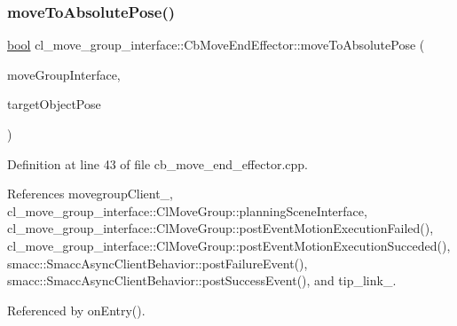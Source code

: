 \subsubsection{\texorpdfstring{move\+To\+Absolute\+Pose()}{moveToAbsolutePose()}}
{\footnotesize\ttfamily \hyperlink{classbool}{bool} cl\+\_\+move\+\_\+group\+\_\+interface\+::\+Cb\+Move\+End\+Effector\+::move\+To\+Absolute\+Pose (\begin{DoxyParamCaption}\item[{moveit\+::planning\+\_\+interface\+::\+Move\+Group\+Interface \&}]{move\+Group\+Interface,  }\item[{geometry\+\_\+msgs\+::\+Pose\+Stamped \&}]{target\+Object\+Pose }\end{DoxyParamCaption})\hspace{0.3cm}{\ttfamily [protected]}}



Definition at line 43 of file cb\+\_\+move\+\_\+end\+\_\+effector.\+cpp.



References movegroup\+Client\+\_\+, cl\+\_\+move\+\_\+group\+\_\+interface\+::\+Cl\+Move\+Group\+::planning\+Scene\+Interface, cl\+\_\+move\+\_\+group\+\_\+interface\+::\+Cl\+Move\+Group\+::post\+Event\+Motion\+Execution\+Failed(), cl\+\_\+move\+\_\+group\+\_\+interface\+::\+Cl\+Move\+Group\+::post\+Event\+Motion\+Execution\+Succeded(), smacc\+::\+Smacc\+Async\+Client\+Behavior\+::post\+Failure\+Event(), smacc\+::\+Smacc\+Async\+Client\+Behavior\+::post\+Success\+Event(), and tip\+\_\+link\+\_\+.



Referenced by on\+Entry().


